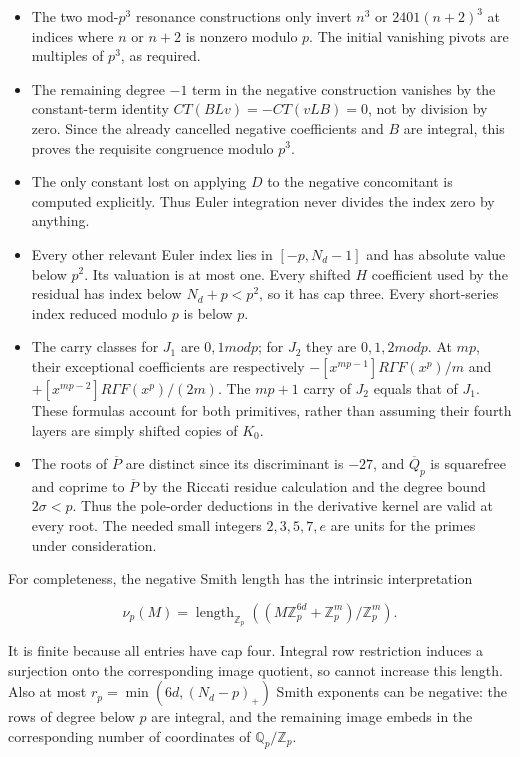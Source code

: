 \documentclass[11pt,a4paper]{article}
\providecommand{\tightlist}{\setlength{\itemsep}{1pt}\setlength{\parskip}{0pt}}
\begin{document}
\begin{itemize}
\tightlist
\item
  The two mod-\(p^{3}\) resonance constructions only invert \(n^{3}\) or \(2401(n+2)^{3}\) at indices where \(n\) or \(n+2\) is nonzero modulo \(p\). The initial vanishing pivots are multiples of \(p^{3}\), as required.
\item
  The remaining degree \(-1\) term in the negative construction vanishes by the constant-term identity \(CT(BLv)=-CT(vLB)=0\), not by division by zero. Since the already cancelled negative coefficients and \(B\) are integral, this proves the requisite congruence modulo \(p^{3}\).
\item
  The only constant lost on applying \(D\) to the negative concomitant is computed explicitly. Thus Euler integration never divides the index zero by anything.
\item
  Every other relevant Euler index lies in \([-p,N_d-1]\) and has absolute value below \(p^{2}\). Its valuation is at most one. Every shifted \(H\) coefficient used by the residual has index below \(N_d+p<p^{2}\), so it has cap three. Every short-series index reduced modulo \(p\) is below \(p\).
\item
  The carry classes for \(J_{1}\) are \(0,1 mod p\); for \(J_{2}\) they are \(0,1,2 mod p\). At \(mp\), their exceptional coefficients are respectively \(-[x^{mp-1}]RΓF(x^p)/m\) and \(+[x^{mp-2}]RΓF(x^p)/(2m)\). The \(mp+1\) carry of \(J_{2}\) equals that of \(J_{1}\). These formulas account for both primitives, rather than assuming their fourth layers are simply shifted copies of \(K_{0}\).
\item
  The roots of \(\overline{P}\) are distinct since its discriminant is \(-27\), and \(\overline{Q}_p\) is squarefree and coprime to \(\overline{P}\) by the Riccati residue calculation and the degree bound \(2σ<p\). Thus the pole-order deductions in the derivative kernel are valid at every root. The needed small integers \(2,3,5,7,e\) are units for the primes under consideration.
\end{itemize}

For completeness, the negative Smith length has the intrinsic interpretation

\[
\nu_p(M)=\operatorname{length}_{\mathbb Z_p}
\left((M\mathbb Z_p^{6d}+\mathbb Z_p^m)/\mathbb Z_p^m\right).
\]

It is finite because all entries have cap four. Integral row restriction induces a surjection onto the corresponding image quotient, so cannot increase this length. Also at most \(r_p=\operatorname{min}(6d,(N_d-p)_{+})\) Smith exponents can be negative: the rows of degree below \(p\) are integral, and the remaining image embeds in the corresponding number of coordinates of \(\mathbb{Q}_p/\mathbb{Z}_p\).
\end{document}
